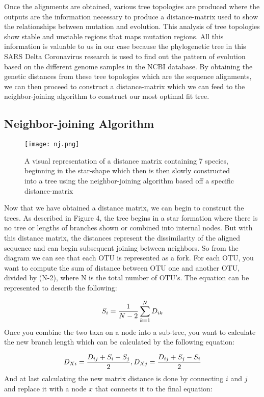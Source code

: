 Once the alignments are obtained, various tree topologies are produced where the outputs are the information necessary to produce a distance-matrix used to show the relationships between mutation and evolution. This analysis of tree topologies show stable and unstable regions that maps mutation regions. All this information is valuable to us in our case because the phylogenetic tree in this SARS Delta Coronavirus research is used to find out the pattern of evolution based on the different genome samples in the NCBI database. By obtaining the genetic distances from these tree topologies which are the sequence alignments, we can then proceed to construct a distance-matrix which we can feed to the neighbor-joining algorithm to construct our most optimal fit tree.

\subsection{Neighbor-joining Algorithm}

\begin{figure}[h!]
\centering
\texttt{[image: nj.png]}
\caption{A visual representation of a distance matrix containing 7 species, beginning in the star-shape which then is then slowly constructed into a tree using the neighbor-joining algorithm based off a specific distance-matrix}
\end{figure}

Now that we have obtained a distance matrix, we can begin to construct the trees. As described in Figure 4, the tree begins in a star formation where there is no tree or lengths of branches shown or combined into internal nodes. But with this distance matrix, the distances represent the dissimilarity of the aligned sequence and can begin subsequent joining between neighbors. So from the diagram we can see that each OTU is represented as a fork. For each OTU, you want to compute the sum of distance between OTU one and another OTU, divided by (N-2), where N is the total number of OTU's. The equation can be represented to describ the following: 

\begin{equation}
\label{computation}
S_i=\frac{1}{N-2}\sum_{k=1}^{N} D_{ik}\\
\end{equation}
Once you combine the two taxa on a node into a sub-tree, you want to calculate the new branch length which can be calculated by the following equation:

\begin{equation}
\label{branch-length}
D_{Xi} = \frac{D_{ij}+S_i-S_j}{2}, D_{Xj} = \frac{D_{ij}+S_j-S_i}{2}\\
\end{equation}
And at last calculating the new matrix distance is done by connecting $i$ and $j$ and replace it with a node $x$ that connects it to the final equation:

